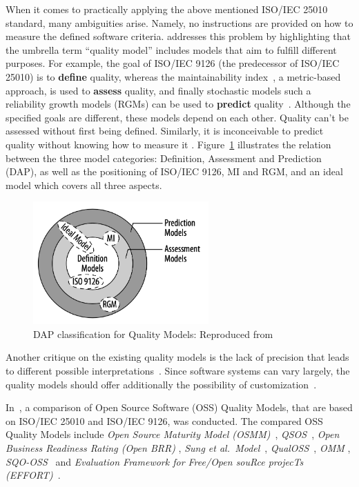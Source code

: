 When it comes to practically applying the above mentioned ISO/IEC 25010 standard,
many ambiguities arise. Namely, no instructions are provided on how to measure
the defined software criteria. \cite{dap_model}
addresses this problem by highlighting that the umbrella term ``quality
model'' includes models that aim to fulfill different purposes. For
example, the goal of ISO/IEC 9126 (the predecessor of ISO/IEC 25010) is to
\textbf{define} quality, whereas the maintainability index~\cite{maintainability_index}, a
metric-based approach, is used to \textbf{assess} quality, and finally
stochastic models such a reliability growth models (RGMs) \cite{rgm} can be
used to \textbf{predict} quality~\cite{dap_model}. Although the specified goals are
different, these models depend on each other. Quality can't be assessed without
first being defined. Similarly, it is inconceivable to predict quality
without knowing how to measure it \cite{dap_model}.
Figure~\ref{image_dap} illustrates the relation
between the three model categories: Definition, Assessment and
Prediction (DAP), as well as the positioning of ISO/IEC 9126, MI and RGM,
and an ideal model which covers all three aspects.

\begin{figure}
\centering
\includegraphics[width=0.6\textwidth]{images/Untitled_15.png}
\caption{DAP classification for Quality Models: Reproduced from~\cite{dap_model}}
    \label{image_dap}
\end{figure}

Another critique on the existing quality models is the lack of precision
that leads to different possible interpretations~\cite{dap_model}. Since software
systems can vary largely, the quality models should offer additionally
the possibility of customization~\cite{dap_model}.

In~\cite{sqm_comparison},
a comparison of Open Source Software (OSS) Quality Models, that are
based on ISO/IEC 25010 and ISO/IEC 9126, was conducted. The compared OSS Quality
Models include \emph{Open Source Maturity Model (OSMM)}~\cite{osmm}, \emph{QSOS}~\cite{qsos}, \emph{Open Business Readiness Rating (Open BRR)} \cite{openbrr}, \emph{Sung et
al.~Model}~\cite{sung_model}, \emph{QualOSS}~\cite{qualoss}, \emph{OMM} \cite{omm}, \emph{SQO-OSS}~\cite{sqo_oss_1,sqo_oss_2} and \emph{Evaluation Framework for Free/Open souRce projecTs
(EFFORT)}~\cite{effort}.

